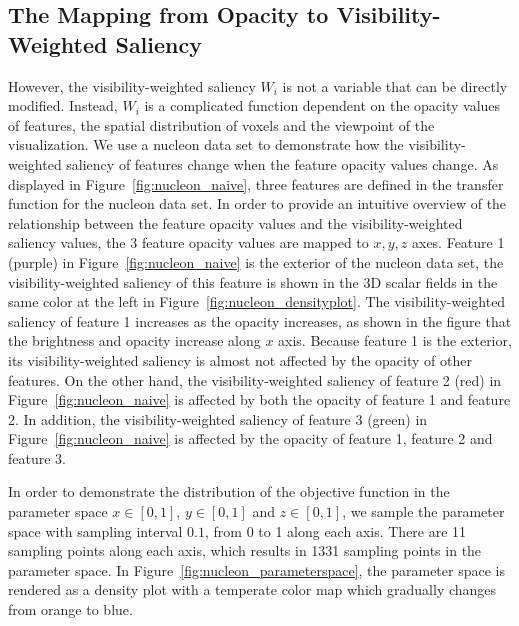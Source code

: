 \subsection{The Mapping from Opacity to Visibility-Weighted Saliency}
However, the visibility-weighted saliency $ W_{i} $ is not a variable that can be directly modified. Instead, $ W_{i} $ is a complicated function dependent on the opacity values of features, the spatial distribution of voxels and the viewpoint of the visualization.
We use a nucleon data set to demonstrate how the visibility-weighted saliency of features change when the feature opacity values change. As displayed in Figure~\ref{fig:nucleon_naive}, three features are defined in the transfer function for the nucleon data set.
In order to provide an intuitive overview of the relationship between the feature opacity values and the visibility-weighted saliency values, the 3 feature opacity values are mapped to $ x, y, z $ axes. Feature 1 (purple) in Figure~\ref{fig:nucleon_naive} is the exterior of the nucleon data set, the visibility-weighted saliency of this feature is shown in the 3D scalar fields in the same color at the left in Figure~\ref{fig:nucleon_densityplot}. The visibility-weighted saliency of feature 1 increases as the opacity increases, as shown in the figure that the brightness and opacity increase along $ x $ axis. Because feature 1 is the exterior, its visibility-weighted saliency is almost not affected by the opacity of other features. On the other hand, the visibility-weighted saliency of feature 2 (red) in Figure~\ref{fig:nucleon_naive} is affected by both the opacity of feature 1 and feature 2. In addition, the visibility-weighted saliency of feature 3 (green) in Figure~\ref{fig:nucleon_naive} is affected by the opacity of feature 1, feature 2 and feature 3.

In order to demonstrate the distribution of the objective function in the parameter space $ x \in [0,1] $, $ y \in [0,1] $ and $ z \in [0,1] $, we sample the parameter space with sampling interval $ 0.1 $, from 0 to 1 along each axis. There are 11 sampling points along each axis, which results in 1331 sampling points in the parameter space. In Figure~\ref{fig:nucleon_parameterspace}, the parameter space is rendered as a density plot with a temperate color map which gradually changes from orange to blue.

